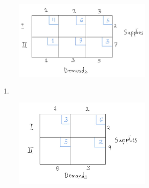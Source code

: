 \documentclass[
  letterpaper,
  DIV=11,
  numbers=noendperiod]{scrreprt}
\providecommand{\tightlist}{%
  \setlength{\itemsep}{0pt}\setlength{\parskip}{0pt}}\usepackage{longtable,booktabs,array}
\begin{document}
\begin{figure}

{\centering \includegraphics[width=0.6\textwidth,height=\textheight]{images/t1.jpeg}

}

\end{figure}

\begin{enumerate}
\def\labelenumi{\alph{enumi})}
\setcounter{enumi}{1}
\tightlist
\item
\end{enumerate}

\begin{figure}

{\centering \includegraphics[width=0.6\textwidth,height=\textheight]{images/t2.jpeg}

}

\end{figure}
\end{document}
